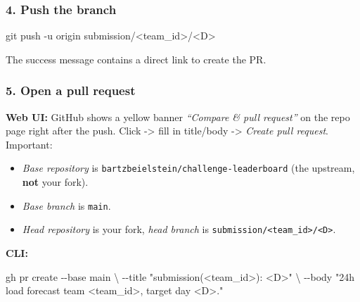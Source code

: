 \documentclass[
  english,
  letterpaper,
]{scrbook}
\newenvironment{Shaded}{\begin{snugshade}}{\end{snugshade}}
\newcommand{\AttributeTok}[1]{\textcolor[rgb]{0.40,0.45,0.13}{#1}}
\newcommand{\DataTypeTok}[1]{\textcolor[rgb]{0.68,0.00,0.00}{#1}}
\newcommand{\ExtensionTok}[1]{\textcolor[rgb]{0.00,0.23,0.31}{#1}}
\newcommand{\FunctionTok}[1]{\textcolor[rgb]{0.28,0.35,0.67}{#1}}
\newcommand{\NormalTok}[1]{\textcolor[rgb]{0.00,0.23,0.31}{#1}}
\newcommand{\OperatorTok}[1]{\textcolor[rgb]{0.37,0.37,0.37}{#1}}
\newcommand{\StringTok}[1]{\textcolor[rgb]{0.13,0.47,0.30}{#1}}
\providecommand{\tightlist}{%
  \setlength{\itemsep}{0pt}\setlength{\parskip}{0pt}}
\begin{document}
\subsubsection{4. Push the branch}\label{push-the-branch}

\begin{Shaded}
\begin{Highlighting}[]
\FunctionTok{git}\NormalTok{ push }\AttributeTok{{-}u}\NormalTok{ origin submission/}\OperatorTok{\textless{}}\NormalTok{team\_id}\OperatorTok{\textgreater{}}\NormalTok{/}\OperatorTok{\textless{}}\NormalTok{D}\OperatorTok{\textgreater{}}
\end{Highlighting}
\end{Shaded}

The success message contains a direct link to create the PR.

\subsubsection{5. Open a pull request}\label{open-a-pull-request}

\textbf{Web UI:} GitHub shows a yellow banner \emph{``Compare \& pull
request''} on the repo page right after the push. Click -\textgreater{}
fill in title/body -\textgreater{} \emph{Create pull request}.
Important:

\begin{itemize}
\tightlist
\item
  \emph{Base repository} is
  \texttt{bartzbeielstein/challenge-leaderboard} (the upstream,
  \textbf{not} your fork).
\item
  \emph{Base branch} is \texttt{main}.
\item
  \emph{Head repository} is your fork, \emph{head branch} is
  \texttt{submission/\textless{}team\_id\textgreater{}/\textless{}D\textgreater{}}.
\end{itemize}

\textbf{CLI:}

\begin{Shaded}
\begin{Highlighting}[]
\ExtensionTok{gh}\NormalTok{ pr create }\AttributeTok{{-}{-}base}\NormalTok{ main }\DataTypeTok{\textbackslash{}}
    \AttributeTok{{-}{-}title} \StringTok{"submission(\textless{}team\_id\textgreater{}): \textless{}D\textgreater{}"} \DataTypeTok{\textbackslash{}}
    \AttributeTok{{-}{-}body}  \StringTok{"24h load forecast team \textless{}team\_id\textgreater{}, target day \textless{}D\textgreater{}."}
\end{Highlighting}
\end{Shaded}
\end{document}
